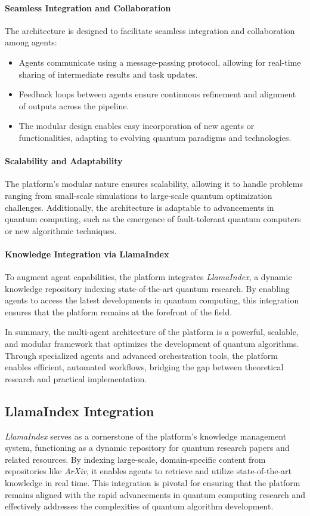 \documentclass[12pt]{article}
\begin{document}
\paragraph{Seamless Integration and Collaboration}
The architecture is designed to facilitate seamless integration and collaboration among agents:
\begin{itemize}
    \item Agents communicate using a message-passing protocol, allowing for real-time sharing of intermediate results and task updates.
    \item Feedback loops between agents ensure continuous refinement and alignment of outputs across the pipeline.
    \item The modular design enables easy incorporation of new agents or functionalities, adapting to evolving quantum paradigms and technologies.
\end{itemize}

\paragraph{Scalability and Adaptability}
The platform’s modular nature ensures scalability, allowing it to handle problems ranging from small-scale simulations to large-scale quantum optimization challenges. Additionally, the architecture is adaptable to advancements in quantum computing, such as the emergence of fault-tolerant quantum computers or new algorithmic techniques.

\paragraph{Knowledge Integration via LlamaIndex}
To augment agent capabilities, the platform integrates \textit{LlamaIndex}, a dynamic knowledge repository indexing state-of-the-art quantum research. By enabling agents to access the latest developments in quantum computing, this integration ensures that the platform remains at the forefront of the field.

In summary, the multi-agent architecture of the platform is a powerful, scalable, and modular framework that optimizes the development of quantum algorithms. Through specialized agents and advanced orchestration tools, the platform enables efficient, automated workflows, bridging the gap between theoretical research and practical implementation.


\subsection{LlamaIndex Integration}
\textit{LlamaIndex} serves as a cornerstone of the platform’s knowledge management system, functioning as a dynamic repository for quantum research papers and related resources. By indexing large-scale, domain-specific content from repositories like \textit{ArXiv}, it enables agents to retrieve and utilize state-of-the-art knowledge in real time. This integration is pivotal for ensuring that the platform remains aligned with the rapid advancements in quantum computing research and effectively addresses the complexities of quantum algorithm development.
\end{document}

